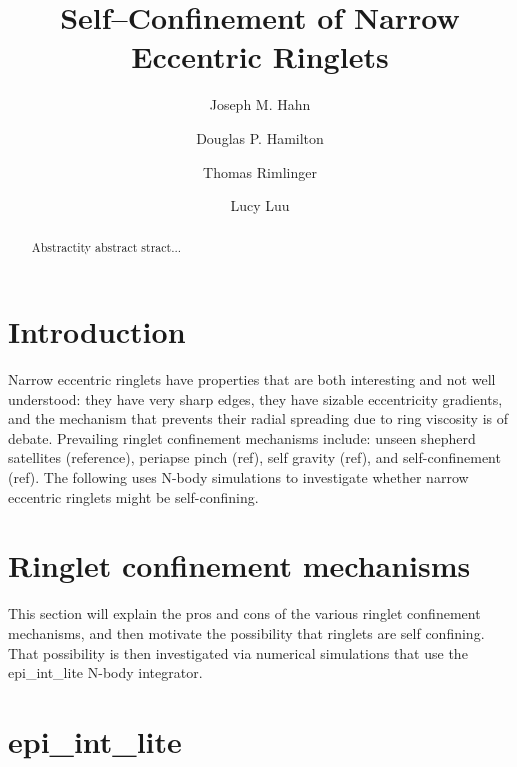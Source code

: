 \documentclass[preprint]{aastex62}
\begin{document}
\title{Self--Confinement of Narrow Eccentric Ringlets}


\author{Joseph M. Hahn}

\author{Douglas P. Hamilton}

\author{Thomas Rimlinger}

\author{Lucy Luu}


\begin{abstract}

Abstractity abstract stract...

\end{abstract}




\section{Introduction}
\label{sec:intro}

Narrow eccentric ringlets have properties that are both interesting and
not well understood: they have very sharp edges,
they have sizable eccentricity gradients, and the mechanism that
prevents their radial spreading due to ring viscosity is of debate.
Prevailing ringlet confinement mechanisms include: 
unseen shepherd satellites (reference), periapse pinch (ref), self gravity (ref), and
self-confinement (ref). The following uses N-body simulations to investigate whether narrow
eccentric ringlets might be self-confining.

\section{Ringlet confinement mechanisms}
\label{sec:confinement}

This section will explain the pros and cons of the various ringlet confinement mechanisms,
and then motivate the possibility that ringlets are self confining. That possibility
is then investigated via numerical simulations that use the epi\_int\_lite N-body integrator.

\section{epi\_int\_lite}
\label{sec:epi_int_lite}
\end{document}
